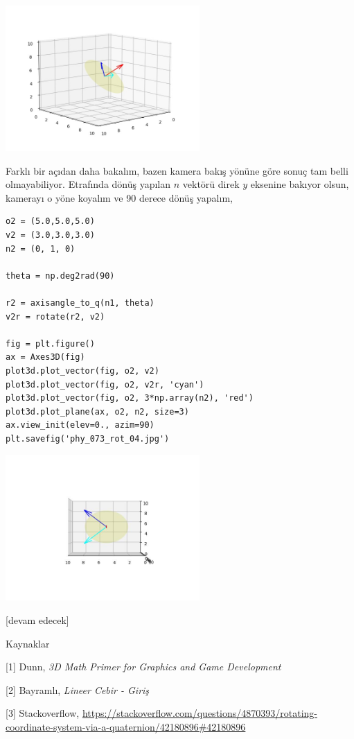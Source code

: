 \documentclass[12pt,fleqn]{article}\usepackage{../../common}
\begin{document}
\includegraphics[width=20em]{phy_073_rot_03.jpg}

Farklı bir açıdan daha bakalım, bazen kamera bakış yönüne göre sonuç tam
belli olmayabiliyor. Etrafında dönüş yapılan $n$ vektörü direk $y$ eksenine
bakıyor olsun, kamerayı o yöne koyalım ve 90 derece dönüş yapalım,

\begin{verbatim}
o2 = (5.0,5.0,5.0)
v2 = (3.0,3.0,3.0)
n2 = (0, 1, 0)

theta = np.deg2rad(90)

r2 = axisangle_to_q(n1, theta)
v2r = rotate(r2, v2)

fig = plt.figure()
ax = Axes3D(fig)
plot3d.plot_vector(fig, o2, v2)
plot3d.plot_vector(fig, o2, v2r, 'cyan')
plot3d.plot_vector(fig, o2, 3*np.array(n2), 'red')
plot3d.plot_plane(ax, o2, n2, size=3)
ax.view_init(elev=0., azim=90)
plt.savefig('phy_073_rot_04.jpg')
\end{verbatim}

\includegraphics[width=20em]{phy_073_rot_04.jpg}


[devam edecek]

Kaynaklar

[1] Dunn, {\em 3D Math Primer for Graphics and Game Development}

[2] Bayramlı, {\em Lineer Cebir - Giriş}

[3] Stackoverflow,
    \url{https://stackoverflow.com/questions/4870393/rotating-coordinate-system-via-a-quaternion/42180896#42180896}
\end{document}
